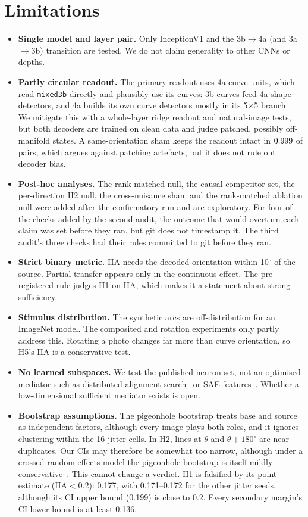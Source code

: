 \documentclass[11pt]{article}
\newcommand{\iia}{\mathrm{IIA}}
\begin{document}
\section{Limitations}
\begin{itemize}
\item \textbf{Single model and layer pair.} Only InceptionV1 and the 3b$\to$4a (and 3a$\to$3b) transition are tested. We do not claim generality to other CNNs or depths.
\item \textbf{Partly circular readout.} The primary readout uses 4a curve units, which read \texttt{mixed3b} directly and plausibly use its curves: 3b curves feed 4a shape detectors, and 4a builds its own curve detectors mostly in its 5$\times$5 branch~\cite{cammarata2021circuits}. We mitigate this with a whole-layer ridge readout and natural-image tests, but both decoders are trained on clean data and judge patched, possibly off-manifold states. A same-orientation sham keeps the readout intact in $0.999$ of pairs, which argues against patching artefacts, but it does not rule out decoder bias.
\item \textbf{Post-hoc analyses.} The rank-matched null, the causal competitor set, the per-direction H2 null, the cross-nuisance sham and the rank-matched ablation null were added after the confirmatory run and are exploratory. For four of the checks added by the second audit, the outcome that would overturn each claim was set before they ran, but git does not timestamp it. The third audit's three checks had their rules committed to git before they ran.
\item \textbf{Strict binary metric.} IIA needs the decoded orientation within 10$^\circ$ of the source. Partial transfer appears only in the continuous effect. The pre-registered rule judges H1 on IIA, which makes it a statement about strong sufficiency.
\item \textbf{Stimulus distribution.} The synthetic arcs are off-distribution for an ImageNet model. The composited and rotation experiments only partly address this. Rotating a photo changes far more than curve orientation, so H5's IIA is a conservative test.
\item \textbf{No learned subspaces.} We test the published neuron set, not an optimised mediator such as distributed alignment search~\cite{geiger2024das} or SAE features~\cite{gorton2024missing}. Whether a low-dimensional sufficient mediator exists is open.
\item \textbf{Bootstrap assumptions.} The pigeonhole bootstrap treats base and source as independent factors, although every image plays both roles, and it ignores clustering within the 16 jitter cells. In H2, lines at $\theta$ and $\theta+180^\circ$ are near-duplicates. Our CIs may therefore be somewhat too narrow, although under a crossed random-effects model the pigeonhole bootstrap is itself mildly conservative~\cite{owen2007pigeonhole}. This cannot change a verdict. H1 is falsified by its point estimate ($\iia<0.2$): 0.177, with 0.171--0.172 for the other jitter seeds, although its CI upper bound (0.199) is close to 0.2. Every secondary margin's CI lower bound is at least 0.136.

\end{itemize}
\end{document}
